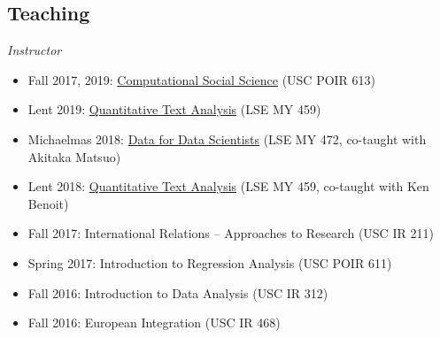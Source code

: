 \documentclass[margin,line,11pt]{resume}
\begin{document}
\begin{resume}
\newpage
            \section{\mysidestyle Teaching}

\emph{Instructor}
\begin{itemize}
\item Fall 2017, 2019: \href{http://pablobarbera.com/POIR613/}{Computational Social Science} (USC POIR 613)
\item Lent 2019: \href{https://lse-my459.github.io/}{Quantitative Text Analysis} (LSE MY 459)
\item Michaelmas 2018: \href{https://lse-my472.github.io/}{Data for Data Scientists} (LSE MY 472, co-taught with Akitaka Matsuo)
\item Lent 2018: \href{https://lse-my459.github.io/}{Quantitative Text Analysis} (LSE MY 459, co-taught with Ken Benoit)
\item Fall 2017: International Relations -- Approaches to Research (USC IR 211)
\item Spring 2017: Introduction to Regression Analysis (USC POIR 611)
\item Fall 2016: Introduction to Data Analysis (USC IR 312)
\item Fall 2016: European Integration (USC IR 468)
\end{itemize}




\end{resume}
\end{document}
